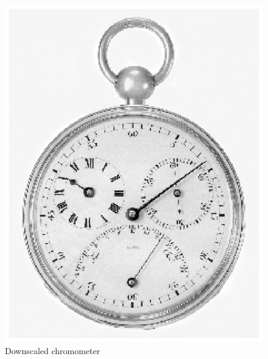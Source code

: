 \begin{figure}
 \centering
 \includegraphics{scaledDownChrono.eps}
 \caption{Downscaled chromometer}
 \label{fig:chromo_down}
\end{figure}